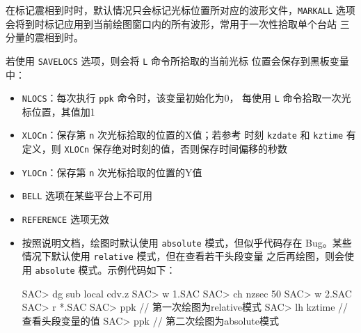在标记震相到时时，默认情况只会标记光标位置所对应的波形文件，\texttt{MARKALL}
选项会将到时标记应用到当前绘图窗口内的所有波形，常用于一次性拾取单个台站
三分量的震相到时。

若使用 \texttt{SAVELOCS} 选项，则会将 \texttt{L} 命令所拾取的当前光标
位置会保存到黑板变量中：
\begin{itemize}
\item \texttt{NLOCS}：每次执行 \texttt{ppk} 命令时，该变量初始化为0，
    每使用 \texttt{L} 命令拾取一次光标位置，其值加1
\item \texttt{XLOCn}：保存第 \texttt{n} 次光标拾取的位置的X值；若参考
    时刻 \texttt{kzdate} 和 \texttt{kztime} 有定义，则 \texttt{XLOCn}
    保存绝对时刻的值，否则保存时间偏移的秒数
\item \texttt{YLOCn}：保存第 \texttt{n} 次光标拾取的位置的Y值
\end{itemize}

\begin{itemize}
\item \texttt{BELL} 选项在某些平台上不可用
\item \texttt{REFERENCE} 选项无效
\item 按照说明文档，绘图时默认使用 \texttt{absolute} 模式，但似乎代码存在
    Bug。某些情况下默认使用 \texttt{relative} 模式，但在查看若干头段变量
    之后再绘图，则会使用 \texttt{absolute} 模式。示例代码如下：
\begin{SACCode}
SAC> dg sub local cdv.z
SAC> w 1.SAC
SAC> ch nzsec 50
SAC> w 2.SAC
SAC> r *.SAC
SAC> ppk            // 第一次绘图为relative模式
SAC> lh kztime      // 查看头段变量的值
SAC> ppk            // 第二次绘图为absolute模式
\end{SACCode}
\end{itemize}
